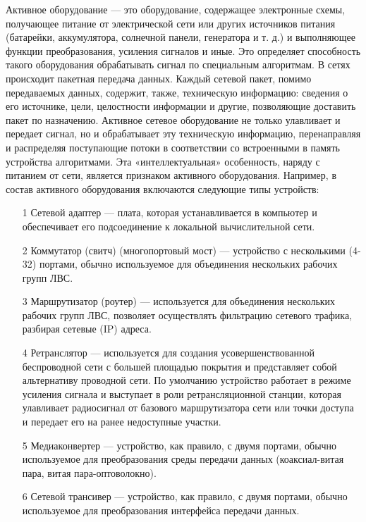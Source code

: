 Активное оборудование — это оборудование, содержащее электронные схемы, получающее питание от электрической сети или других источников питания (батарейки, аккумулятора, солнечной панели, генератора и т. д.) и выполняющее функции преобразования, усиления сигналов и иные. Это определяет способность такого оборудования обрабатывать сигнал по специальным алгоритмам. В сетях происходит пакетная передача данных. Каждый сетевой пакет, помимо передаваемых данных, содержит, также, техническую информацию: сведения о его источнике, цели, целостности информации и другие, позволяющие доставить пакет по назначению. Активное сетевое оборудование не только улавливает и передает сигнал, но и обрабатывает эту техническую информацию, перенаправляя и распределяя поступающие потоки в соответствии со встроенными в память устройства алгоритмами. Эта «интеллектуальная» особенность, наряду с питанием от сети, является признаком активного оборудования. Например, в состав активного оборудования включаются следующие типы устройств:
\begin{enumerate}
    \item[1] Сетевой адаптер — плата, которая устанавливается в компьютер и обеспечивает его подсоединение к локальной вычислительной сети.
     \item[2] Коммутатор (свитч) (многопортовый мост) — устройство с несколькими (4-32) портами, обычно используемое для объединения нескольких рабочих групп ЛВС.
     \item[3] Маршрутизатор (роутер) — используется для объединения нескольких рабочих групп ЛВС, позволяет осуществлять фильтрацию сетевого трафика, разбирая сетевые (IP) адреса.
     \item[4] Ретранслятор — используется для создания усовершенствованной беспроводной сети с большей площадью покрытия и представляет собой альтернативу проводной сети. По умолчанию устройство работает в режиме усиления сигнала и выступает в роли ретрансляционной станции, которая улавливает радиосигнал от базового маршрутизатора сети или точки доступа и передает его на ранее недоступные участки.
     \item[5] Медиаконвертер — устройство, как правило, с двумя портами, обычно используемое для преобразования среды передачи данных (коаксиал-витая пара, витая пара-оптоволокно).
      \item[6] Сетевой трансивер — устройство, как правило, с двумя портами, обычно используемое для преобразования интерфейса передачи данных.
\end{enumerate}

